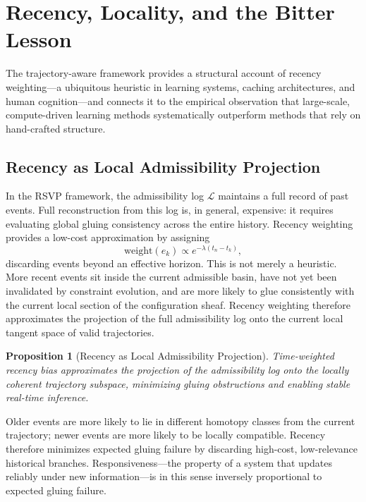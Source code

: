 \documentclass[11pt, a4paper, twocolumn]{article}
\newtheorem{proposition}[definition]{Proposition}
\begin{document}
\section{Recency, Locality, and the Bitter Lesson}

The trajectory-aware framework provides a structural account of recency
weighting---a ubiquitous heuristic in learning systems, caching architectures,
and human cognition---and connects it to the empirical observation that
large-scale, compute-driven learning methods systematically outperform methods
that rely on hand-crafted structure.

\subsection{Recency as Local Admissibility Projection}

In the RSVP framework, the admissibility log $\mathcal{L}$ maintains a full
record of past events. Full reconstruction from this log is, in general,
expensive: it requires evaluating global gluing consistency across the entire
history. Recency weighting provides a low-cost approximation by assigning
\[
    \mathrm{weight}(e_k) \propto e^{-\lambda(t_n - t_k)},
\]
discarding events beyond an effective horizon. This is not merely a heuristic.
More recent events sit inside the current admissible basin, have not yet been
invalidated by constraint evolution, and are more likely to glue consistently
with the current local section of the configuration sheaf. Recency weighting
therefore approximates the projection of the full admissibility log onto the
current local tangent space of valid trajectories.

\begin{proposition}[Recency as Local Admissibility Projection]
Time-weighted recency bias approximates the projection of the admissibility
log onto the locally coherent trajectory subspace, minimizing gluing
obstructions and enabling stable real-time inference.
\end{proposition}

Older events are more likely to lie in different homotopy classes from the
current trajectory; newer events are more likely to be locally compatible.
Recency therefore minimizes expected gluing failure by discarding high-cost,
low-relevance historical branches. Responsiveness---the property of a system
that updates reliably under new information---is in this sense inversely
proportional to expected gluing failure.
\end{document}
